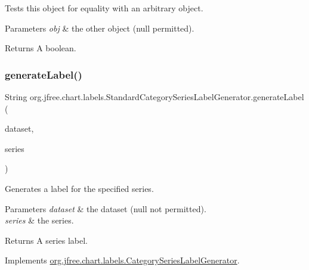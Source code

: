 Tests this object for equality with an arbitrary object.


\begin{DoxyParams}{Parameters}
{\em obj} & the other object ({\ttfamily null} permitted).\\
\hline
\end{DoxyParams}
\begin{DoxyReturn}{Returns}
A boolean. 
\end{DoxyReturn}
\mbox{\label{classorg_1_1jfree_1_1chart_1_1labels_1_1_standard_category_series_label_generator_a9aeba3bfd749fa93a0477811d56b339a}} 
\subsubsection{\texorpdfstring{generate\+Label()}{generateLabel()}}
{\footnotesize\ttfamily String org.\+jfree.\+chart.\+labels.\+Standard\+Category\+Series\+Label\+Generator.\+generate\+Label (\begin{DoxyParamCaption}\item[{\mbox{\hyperlink{interfaceorg_1_1jfree_1_1data_1_1category_1_1_category_dataset}{Category\+Dataset}}}]{dataset,  }\item[{int}]{series }\end{DoxyParamCaption})}

Generates a label for the specified series.


\begin{DoxyParams}{Parameters}
{\em dataset} & the dataset ({\ttfamily null} not permitted). \\
\hline
{\em series} & the series.\\
\hline
\end{DoxyParams}
\begin{DoxyReturn}{Returns}
A series label. 
\end{DoxyReturn}


Implements \mbox{\hyperlink{interfaceorg_1_1jfree_1_1chart_1_1labels_1_1_category_series_label_generator_a7b6ff7a5a11c77b3a2cede3b31dd314f}{org.\+jfree.\+chart.\+labels.\+Category\+Series\+Label\+Generator}}.

